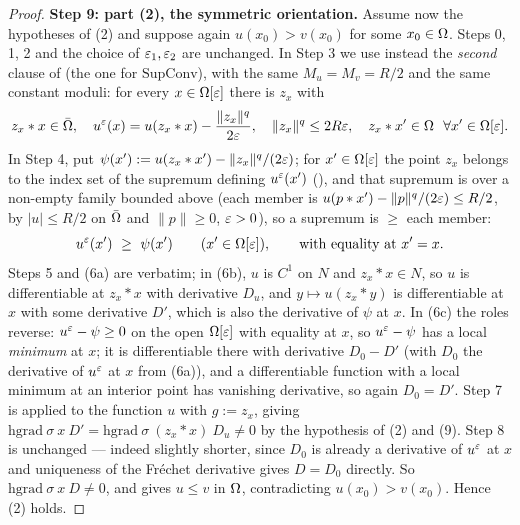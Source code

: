 \begin{proof}
\medskip\noindent\textbf{Step 9: part (2), the symmetric orientation.} Assume now the
hypotheses of (2) and suppose again $u(x_0)>v(x_0)$ for some $x_0\in\Omega$. Steps 0, 1, 2 and
the choice of $\varepsilon_1,\varepsilon_2$ are unchanged. In Step 3 we use instead the \emph{second}
clause of  (the one for $\mathrm{SupConv}$), with the same
$M_u=M_v=R/2$ and the same constant moduli: for every $x\in\Omega[\varepsilon]$ there is $z_x$ with
\[
 z_x*x\in\bar{\Omega},\quad
 u^{\varepsilon}(x)=u(z_x*x)-\frac{\|z_x\|^{q}}{2\varepsilon},\quad
 \|z_x\|^{q}\le2R\varepsilon,\quad z_x*x'\in\Omega\ \ \forall x'\in\Omega[\varepsilon].
\]
In Step 4, put $\psi(x'):=u(z_x*x')-\|z_x\|^{q}/(2\varepsilon)$; for $x'\in\Omega[\varepsilon]$ the point
$z_x$ belongs to the index set of the supremum defining $u^{\varepsilon}(x')$ (),
and that supremum is over a non-empty family bounded above (each member is
$u(p*x')-\|p\|^{q}/(2\varepsilon)\le R/2$, by $|u|\le R/2$ on $\bar{\Omega}$ and $\|p\|\ge0$, $\varepsilon>0$),
so a supremum is $\ge$ each member:
\[
 u^{\eps}(x')\ \ge\ \psi(x')\qquad(x'\in\Om[\eps]),\qquad\text{with equality at }x'=x .
\]
Steps 5 and (6a) are verbatim; in (6b), $u$ is $C^{1}$ on $N$ and $z_x*x\in N$, so $u$ is
differentiable at $z_x*x$ with derivative $D_u$, and $y\mapsto u(z_x*y)$ is differentiable at
$x$ with some derivative $D'$, which is also the derivative of $\psi$ at $x$. In (6c) the
roles reverse: $u^{\varepsilon}-\psi\ge0$ on the open $\Omega[\varepsilon]$ with equality at $x$, so
$u^{\varepsilon}-\psi$ has a local \emph{minimum} at $x$; it is differentiable there with derivative
$D_0-D'$ (with $D_0$ the derivative of $u^{\varepsilon}$ at $x$ from (6a)), and a differentiable
function with a local minimum at an interior point has vanishing derivative, so again
$D_0=D'$. Step 7 is  applied to the function $u$ with $g:=z_x$,
giving $\mathrm{hgrad}\ \sigma\ x\ D'=\mathrm{hgrad}\ \sigma\ (z_x*x)\ D_u\ne0$ by the
hypothesis of (2) and (9). Step 8 is unchanged --- indeed slightly shorter, since $D_0$ is
already a derivative of $u^{\varepsilon}$ at $x$ and uniqueness of the Fréchet derivative gives
$D=D_0$ directly. So $\mathrm{hgrad}\ \sigma\ x\ D\ne0$, and
 gives $u\le v$ in $\Omega$, contradicting
$u(x_0)>v(x_0)$. Hence (2) holds.
\end{proof}
